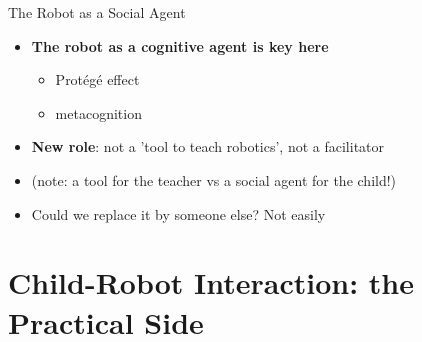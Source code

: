 \documentclass[handout,compress]{beamer}
\begin{document}
{


\begin{frame}{The Robot as a Social Agent}
    \begin{itemize}
        \item<+-> {\bf The robot as a cognitive agent is key here}
            \begin{itemize}
                \item Protégé effect
                \item metacognition
            \end{itemize}
        \item<+-> \textbf{New role}: not a 'tool to teach robotics', not a facilitator
        \item<+-> (note: a tool for the teacher vs a social agent for the child!)
        \item<+-> Could we replace it by someone else? Not easily
    \end{itemize}
\end{frame}
}


\section[Practical CRI]{Child-Robot Interaction: the Practical Side}



\end{document}
